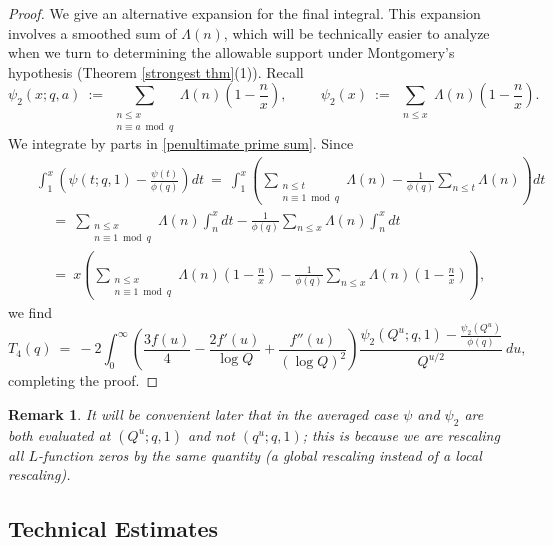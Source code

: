 \documentclass[12pt,reqno]{amsart}
\numberwithin{equation}{section}
\theoremstyle{plain}
\newtheorem{rek}[thm]{Remark}
\begin{document}
\begin{proof}
We give an alternative expansion for the final integral. This expansion involves a smoothed sum of $\Lambda(n)$, which will be technically easier to analyze when we turn to determining the allowable support under Montgomery's hypothesis (Theorem \ref{strongest thm}(1)). Recall \begin{equation} \psi_2(x;q,a)\ :=\ \sum_{\substack{n\leq x\\n\equiv a \bmod q}} \Lambda(n)\left(1-\frac nx\right), \hspace{1cm} \psi_2(x) \ :=\ \sum_{\substack{n\leq x}} \Lambda(n)\left(1-\frac nx\right). \end{equation} We integrate by parts in \eqref{penultimate prime sum}. Since \begin{eqnarray}
& &  \int_1^{x} \left(\psi(t;q,1)-\frac{\psi(t)}{\phi(q)}\right) dt \ = \  \int_1^{x} \left(\sum_{\substack{n\leq t \\ n\equiv 1 \bmod q}} \Lambda(n) - \frac 1{\phi(q)} \sum_{n\leq t} \Lambda(n)\right) dt \nonumber\\
& & \ \ \ \ \ = \ \sum_{\substack{n\leq x \\ n\equiv 1 \bmod q}}\Lambda(n) \int_n^x dt - \frac 1{\phi(q)} \sum_{n\leq x} \Lambda(n)\int_n^x dt \nonumber\\
& & \ \ \ \ \ = \  x\left( \sum_{\substack{n\leq x \\ n\equiv 1 \bmod q}}\Lambda(n) \left(1-\frac nx \right) - \frac 1{\phi(q)} \sum_{n\leq x} \Lambda(n)\left(1-\frac nx \right) \right),
\end{eqnarray}
we find \begin{equation}T_4(q) \ = \ -2 \int_0^{\infty} \left(\frac {3f(u)}4 -\frac {2f'(u)}{\log Q} +\frac {f''(u)}{(\log Q)^2}\right)\frac{\psi_2(Q^u;q,1)-\frac{\psi_2(Q^u)}{\phi(q)}}{Q^{u/2}}\ du,
\end{equation}
completing the proof.
\end{proof}

\begin{rek} It will be convenient later that in the averaged case $\psi$ and $\psi_2$ are both evaluated at $(Q^u;q,1)$ and not $(q^u;q,1)$; this is because we are rescaling all $L$-function zeros by the same quantity (a global rescaling instead of a local rescaling).  \end{rek}

\subsection{Technical Estimates}
\end{document}
